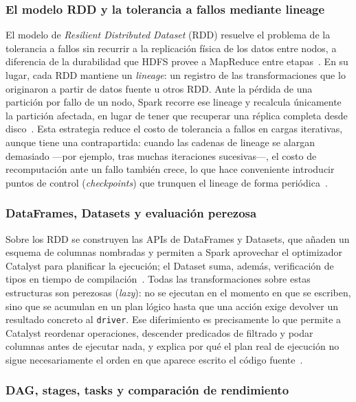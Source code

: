\documentclass[11pt,a4paper]{article}
\begin{document}
\subsubsection{El modelo RDD y la tolerancia a fallos mediante lineage}

El modelo de \emph{Resilient Distributed Dataset} (RDD) resuelve el
problema de la tolerancia a fallos sin recurrir a la replicación
física de los datos entre nodos, a diferencia de la durabilidad que
HDFS provee a MapReduce entre etapas~\autocite{zaharia2012}. En su lugar,
cada RDD mantiene un \emph{lineage}: un registro de las
transformaciones que lo originaron a partir de datos fuente u otros
RDD. Ante la pérdida de una partición por fallo de un nodo, Spark
recorre ese lineage y recalcula únicamente la partición afectada, en
lugar de tener que recuperar una réplica completa desde
disco~\autocite{zaharia2012,khuat2025}. Esta estrategia reduce el costo de
tolerancia a fallos en cargas iterativas, aunque tiene una
contrapartida: cuando las cadenas de lineage se alargan demasiado —por
ejemplo, tras muchas iteraciones sucesivas—, el costo de
recomputación ante un fallo también crece, lo que hace conveniente
introducir puntos de control (\emph{checkpoints}) que trunquen el
lineage de forma periódica~\autocite{zaharia2012}.

\subsubsection{DataFrames, Datasets y evaluación perezosa}

Sobre los RDD se construyen las APIs de DataFrames y Datasets, que
añaden un esquema de columnas nombradas y permiten a Spark aprovechar
el optimizador Catalyst para planificar la ejecución; el Dataset suma,
además, verificación de tipos en tiempo de
compilación~\autocite{armbrust2015,tang2020}. Todas las transformaciones
sobre estas estructuras son perezosas (\emph{lazy}): no se ejecutan en
el momento en que se escriben, sino que se acumulan en un plan lógico
hasta que una acción exige devolver un resultado concreto al
\texttt{driver}. Ese diferimiento es precisamente lo que permite a
Catalyst reordenar operaciones, descender predicados de filtrado y
podar columnas antes de ejecutar nada, y explica por qué el plan real
de ejecución no sigue necesariamente el orden en que aparece escrito
el código fuente~\autocite{armbrust2015,tang2020}.

\subsubsection{DAG, stages, tasks y comparación de rendimiento}
\end{document}
